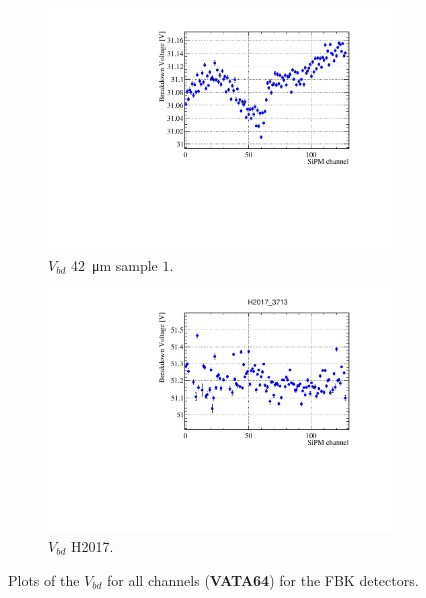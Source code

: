 \begin{figure}[htbp]
\begin{subfigure}{0.48\textwidth}
    \includegraphics[width=\textwidth]{gfx/plots/WA/42/Vbd42.pdf}
    \caption{$V_{bd}$ \SI{42}{\micro m} sample $1$.}
    \label{fig:}
  \end{subfigure}
  \hfill
  \begin{subfigure}{0.48\textwidth}
    \includegraphics[width=\textwidth]{gfx/plots/WA/H2017/H2016_va64.pdf}
    \caption{$V_{bd}$ H2017.}
    \label{fig:}
  \end{subfigure}
  \caption{Plots of the $V_{bd}$ for all channels (\textbf{VATA64}) for the FBK detectors. }
  \label{fig:Vbd all channels Guido}
\end{figure}

